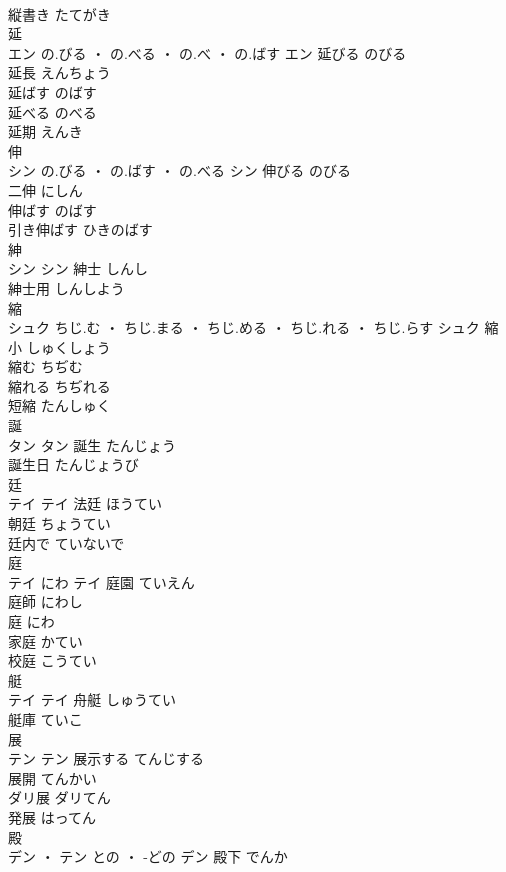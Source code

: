 \documentclass[8pt]{extreport}
\begin{document}
\begin{CJK}{UTF8}{min}
\\	縦書き	たてがき	
\\	延	
\\	エン	の.びる ・ の.べる ・ の.べ ・ の.ばす	エン	延びる	のびる	
\\	延長	えんちょう	
\\	延ばす	のばす	
\\	延べる	のべる	
\\	延期	えんき	
\\	伸	
\\	シン	の.びる ・ の.ばす ・ の.べる	シン	伸びる	のびる	
\\	二伸	にしん	
\\	伸ばす	のばす	
\\	引き伸ばす	ひきのばす	
\\	紳	
\\	シン		シン	紳士	しんし	
\\	紳士用	しんしよう	
\\	縮	
\\	シュク	ちじ.む ・ ちじ.まる ・ ちじ.める ・ ちじ.れる ・ ちじ.らす	シュク	縮小	しゅくしょう	
\\	縮む	ちぢむ	
\\	縮れる	ちぢれる	
\\	短縮	たんしゅく	
\\	誕	
\\	タン		タン	誕生	たんじょう	
\\	誕生日	たんじょうび	
\\	廷	
\\	テイ		テイ	法廷	ほうてい	
\\	朝廷	ちょうてい	
\\	廷内で	ていないで	
\\	庭	
\\	テイ	にわ	テイ	庭園	ていえん	
\\	庭師	にわし	
\\	庭	にわ	
\\	家庭	かてい	
\\	校庭	こうてい	
\\	艇	
\\	テイ		テイ	舟艇	しゅうてい	
\\	艇庫	ていこ	
\\	展	
\\	テン		テン	展示する	てんじする	
\\	展開	てんかい	
\\	ダリ展	ダリてん	
\\	発展	はってん	
\\	殿	
\\	デン ・ テン	との ・ -どの	デン	殿下	でんか	

\end{CJK}
\end{document}

